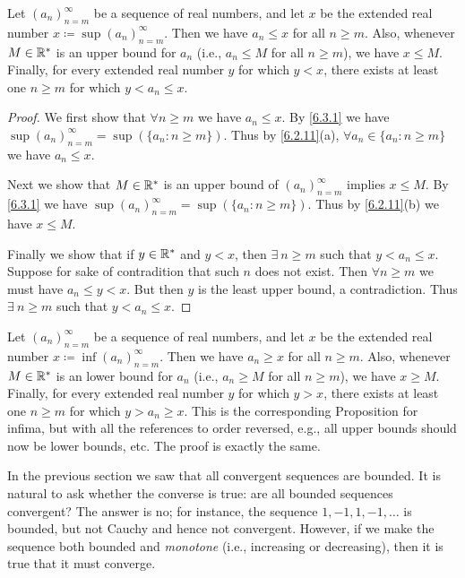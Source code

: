 \setcounter{thm}{5}
\begin{prop}\label{6.3.6}
  Let \((a_n)_{n = m}^\infty\) be a sequence of real numbers, and let \(x\) be the extended real number \(x \coloneqq \sup(a_n)_{n = m}^\infty\).
  Then we have \(a_n \leq x\) for all \(n \geq m\).
  Also, whenever \(M \in \mathbb{R}^*\) is an upper bound for \(a_n\) (i.e., \(a_n \leq M\) for all \(n \geq m\)), we have \(x \leq M\).
  Finally, for every extended real number \(y\) for which \(y < x\), there exists at least one \(n \geq m\) for which \(y < a_n \leq x\).
\end{prop}

\begin{proof}
  We first show that \(\forall n \geq m\) we have \(a_n \leq x\).
  By \cref{6.3.1} we have \(\sup(a_n)_{n = m}^\infty = \sup(\{a_n : n \geq m\})\).
  Thus by \cref{6.2.11}(a), \(\forall a_n \in \{a_n : n \geq m\}\) we have \(a_n \leq x\).

  Next we show that \(M \in \mathbb{R}^*\) is an upper bound of \((a_n)_{n = m}^\infty\) implies \(x \leq M\).
  By \cref{6.3.1} we have \(\sup(a_n)_{n = m}^\infty = \sup(\{a_n : n \geq m\})\).
  Thus by \cref{6.2.11}(b) we have \(x \leq M\).

  Finally we show that if \(y \in \mathbb{R}^*\) and \(y < x\), then \(\exists\ n \geq m\) such that \(y < a_n \leq x\).
  Suppose for sake of contradition that such \(n\) does not exist.
  Then \(\forall n \geq m\) we must have \(a_n \leq y < x\).
  But then \(y\) is the least upper bound, a contradiction.
  Thus \(\exists\ n \geq m\) such that \(y < a_n \leq x\).
\end{proof}

\begin{rmk}\label{6.3.7}
  Let \((a_n)_{n = m}^\infty\) be a sequence of real numbers, and let \(x\) be the extended real number \(x \coloneqq \inf(a_n)_{n = m}^\infty\).
  Then we have \(a_n \geq x\) for all \(n \geq m\).
  Also, whenever \(M \in \mathbb{R}^*\) is an lower bound for \(a_n\) (i.e., \(a_n \geq M\) for all \(n \geq m\)), we have \(x \geq M\).
  Finally, for every extended real number \(y\) for which \(y > x\), there exists at least one \(n \geq m\) for which \(y > a_n \geq x\).
  This is the corresponding Proposition for infima, but with all the references to order reversed, e.g., all upper bounds should now be lower bounds, etc.
  The proof is exactly the same.
\end{rmk}

\begin{note}
  In the previous section we saw that all convergent sequences are bounded.
  It is natural to ask whether the converse is true:
  are all bounded sequences convergent?
  The answer is no;
  for instance, the sequence \(1, -1, 1, -1, \dots\) is bounded, but not Cauchy and hence not convergent.
  However, if we make the sequence both bounded and \emph{monotone} (i.e., increasing or decreasing), then it is true that it must converge.
\end{note}

